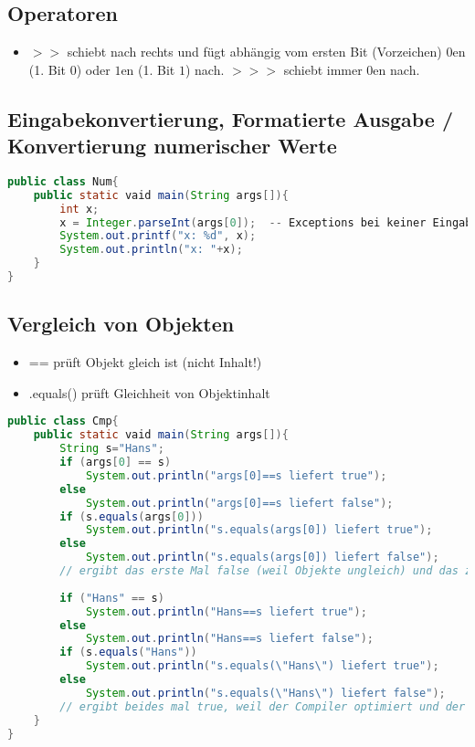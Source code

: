 \subsection{Operatoren}
\begin{itemize}
\item $>>$ schiebt nach rechts und fügt abhängig vom ersten Bit (Vorzeichen) $0$en (1. Bit $0$) oder $1$en (1. Bit $1$) nach. $>>>$ schiebt immer $0$en nach.
\end{itemize}

\subsection[Eingabekonvertierung, Formatierte Ausgabe]{Eingabekonvertierung, Formatierte Ausgabe / Konvertierung numerischer Werte}
\begin{lstlisting}[language=Java]
public class Num{
	public static vaid main(String args[]){
		int x;
		x = Integer.parseInt(args[0]);	-- Exceptions bei keiner Eingabe und bspw. String-Eingabe
		System.out.printf("x: %d", x);
		System.out.println("x: "+x);
	}
}
\end{lstlisting}

\subsection{Vergleich von Objekten}
\begin{itemize}
\item == prüft Objekt gleich ist (nicht Inhalt!)
\item .equals() prüft Gleichheit von Objektinhalt
\end{itemize}
\begin{lstlisting}[language=Java]
public class Cmp{
	public static vaid main(String args[]){
		String s="Hans";
		if (args[0] == s)
			System.out.println("args[0]==s liefert true");
		else
			System.out.println("args[0]==s liefert false");
		if (s.equals(args[0]))
			System.out.println("s.equals(args[0]) liefert true");
		else
			System.out.println("s.equals(args[0]) liefert false");
		// ergibt das erste Mal false (weil Objekte ungleich) und das zweite Mal true (weil Objektinhalt gleich).
			
		if ("Hans" == s)
			System.out.println("Hans==s liefert true");
		else
			System.out.println("Hans==s liefert false");
		if (s.equals("Hans"))
			System.out.println("s.equals(\"Hans\") liefert true");
		else
			System.out.println("s.equals(\"Hans\") liefert false");
		// ergibt beides mal true, weil der Compiler optimiert und der "Hans" String nicht doppelt erzeugt wurde.
	}
}
\end{lstlisting}

